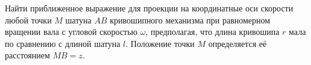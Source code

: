 Найти приближенное выражение для проекции на координатные оси скорости
любой точки $M$ шатуна $AB$ кривошипного механизма при равномерном вращении
вала с угловой скоростью $\omega$, предполагая, что длина кривошипа $r$
мала по сравнению с длиной шатуна $l$.
Положение точки $M$ определяется её расстоянием $MB = z$.
